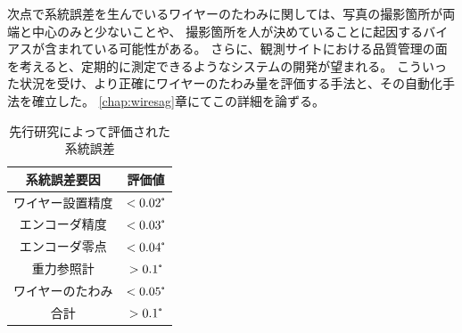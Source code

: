 \documentclass[../../main.tex]{subfiles}
\begin{document}
次点で系統誤差を生んでいるワイヤーのたわみに関しては、写真の撮影箇所が両端と中心のみと少ないことや、
撮影箇所を人が決めていることに起因するバイアスが含まれている可能性がある。
さらに、観測サイトにおける品質管理の面を考えると、定期的に測定できるようなシステムの開発が望まれる。
こういった状況を受け、より正確にワイヤーのたわみ量を評価する手法と、その自動化手法を確立した。
\ref{chap:wiresag}章にてこの詳細を論ずる。
\begin{table}[H]
    \centering
    \caption{先行研究によって評価された系統誤差}
    \begin{tabular}{|c|c|}
        \hline
        系統誤差要因 & 評価値 \\
        \hline
        ワイヤー設置精度 & $< 0.02\tcdegree$ \\
        エンコーダ精度 & $<0.03\tcdegree$ \\
        エンコーダ零点 & $<0.04\tcdegree$ \\
        重力参照計 & $>0.1\tcdegree$ \\
        ワイヤーのたわみ & $<0.05\tcdegree$ \\
        \hline
        合計 & $>0.1\tcdegree$ \\
        \hline
    \end{tabular}
    \label{tab:systematic_errors_old}
\end{table}
\end{document}
